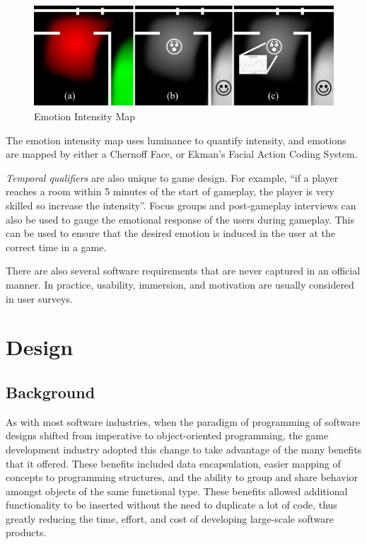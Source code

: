 \begin{figure}[htb]
	\includegraphics[scale=0.27]{Images/emotion_intensity_map}
	\caption{Emotion Intensity Map \cite{callele2006emotional}}
	\label{emotion_intensity_map}
\end{figure}

The emotion intensity map uses luminance to quantify intensity, and emotions are mapped by either a Chernoff Face\cite{flury1981graphical}, or Ekman's Facial Action Coding System\cite{ekman2002facial}.

\emph{Temporal qualifiers} are also unique to game design. For example, ``if a player reaches a room within 5 minutes of the start of gameplay, the player is very skilled so increase the intensity''\cite{callele2006emotional}. Focus groups and post-gameplay interviews can also be used to gauge the emotional response of the users during gameplay. This can be used to ensure that the desired emotion is induced in the user at the correct time in a game.

There are also several software requirements that are never captured in an official manner\cite{bentley2002putting}. In practice, usability, immersion, and motivation are usually considered in user surveys.

\section{Design}

\subsection{Background}
As with most software industries, when the paradigm of programming of software designs shifted from imperative to object-oriented programming, the game development industry adopted this change to take advantage of the many benefits that it offered. These benefits included data encapsulation, easier mapping of concepts to programming structures, and the ability to group and share behavior amongst objects of the same functional type. These benefits allowed additional functionality to be inserted without the need to duplicate a lot of code, thus greatly reducing the time, effort, and cost of developing large-scale software products.

